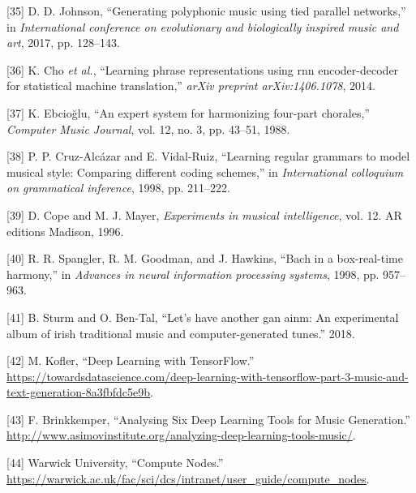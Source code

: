 \documentclass[12pt,]{article}
\begin{document}
\leavevmode\hypertarget{ref-johnson2017generating}{}%
{[}35{]} D. D. Johnson, ``Generating polyphonic music using tied
parallel networks,'' in \emph{International conference on evolutionary
and biologically inspired music and art}, 2017, pp. 128--143.

\leavevmode\hypertarget{ref-cho2014learning}{}%
{[}36{]} K. Cho \emph{et al.}, ``Learning phrase representations using
rnn encoder-decoder for statistical machine translation,'' \emph{arXiv
preprint arXiv:1406.1078}, 2014.

\leavevmode\hypertarget{ref-ebciouglu1988expert}{}%
{[}37{]} K. Ebcioğlu, ``An expert system for harmonizing four-part
chorales,'' \emph{Computer Music Journal}, vol. 12, no. 3, pp. 43--51,
1988.

\leavevmode\hypertarget{ref-cruz1998learning}{}%
{[}38{]} P. P. Cruz-Alcázar and E. Vidal-Ruiz, ``Learning regular
grammars to model musical style: Comparing different coding schemes,''
in \emph{International colloquium on grammatical inference}, 1998, pp.
211--222.

\leavevmode\hypertarget{ref-cope1996experiments}{}%
{[}39{]} D. Cope and M. J. Mayer, \emph{Experiments in musical
intelligence}, vol. 12. AR editions Madison, 1996.

\leavevmode\hypertarget{ref-spangler1998bach}{}%
{[}40{]} R. R. Spangler, R. M. Goodman, and J. Hawkins, ``Bach in a
box-real-time harmony,'' in \emph{Advances in neural information
processing systems}, 1998, pp. 957--963.

\leavevmode\hypertarget{ref-sturm2018let}{}%
{[}41{]} B. Sturm and O. Ben-Tal, ``Let's have another gan ainm: An
experimental album of irish traditional music and computer-generated
tunes.'' 2018.

\leavevmode\hypertarget{ref-mkofler}{}%
{[}42{]} M. Kofler, ``Deep Learning with TensorFlow.'' \\
\url{https://towardsdatascience.com/deep-learning-with-tensorflow-part-3-music-and-text-generation-8a3fbfdc5e9b}.

\leavevmode\hypertarget{ref-asimovinst}{}%
{[}43{]} F. Brinkkemper, ``Analysing Six Deep Learning Tools for Music
Generation.'' \\
\url{http://www.asimovinstitute.org/analyzing-deep-learning-tools-music/}.

\leavevmode\hypertarget{ref-warwickcomputenodes}{}%
{[}44{]} \relax Warwick University, ``Compute Nodes.'' \\
\url{https://warwick.ac.uk/fac/sci/dcs/intranet/user_guide/compute_nodes}.
\end{document}
